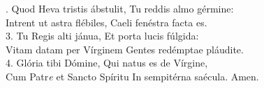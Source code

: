 . Quod Heva tristis ábstulit, Tu reddis almo gérmine:\\
Intrent ut astra flébiles, Caeli fenéstra facta es.\\

3. Tu Regis alti jánua, Et porta lucis fúlgida:\\
Vitam datam per Vírginem Gentes redémptae pláudite.\\

4. Glória tibi Dómine, Qui natus es de Vírgine,\\
Cum Patr\textit{e} et Sancto Spíritu In sempitérna saécula. Amen.
